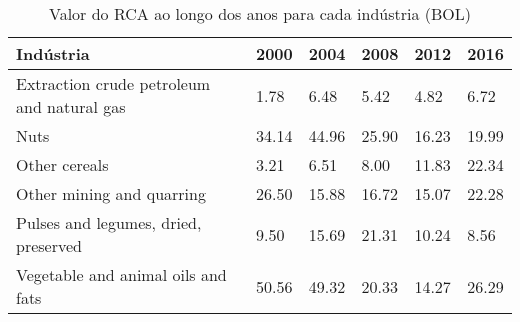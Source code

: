\begin{table}
\centering
\caption{Valor do RCA ao longo dos anos para cada indústria (BOL)}
\label{tab:ex3-tempo-BOL}
\begin{tabular}{p{6cm}p{1.5cm}p{1.5cm}p{1.5cm}p{1.5cm}p{1.5cm}}
\toprule
                                 Indústria &  2000 &  2004 &  2008 &  2012 &  2016 \\
\midrule
Extraction crude petroleum and natural gas &  1.78 &  6.48 &  5.42 &  4.82 &  6.72 \\
                                      Nuts & 34.14 & 44.96 & 25.90 & 16.23 & 19.99 \\
                             Other cereals &  3.21 &  6.51 &  8.00 & 11.83 & 22.34 \\
                 Other mining and quarring & 26.50 & 15.88 & 16.72 & 15.07 & 22.28 \\
      Pulses and legumes, dried, preserved &  9.50 & 15.69 & 21.31 & 10.24 &  8.56 \\
        Vegetable and animal oils and fats & 50.56 & 49.32 & 20.33 & 14.27 & 26.29 \\
\bottomrule
\end{tabular}
\end{table}
